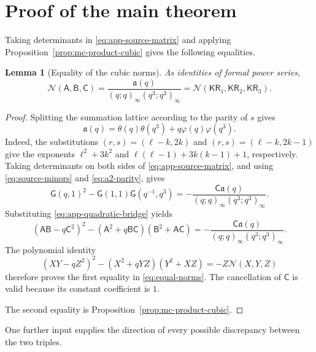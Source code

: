 \documentclass[11pt]{article}
\numberwithin{equation}{section}
\newtheorem{lemma}[theorem]{Lemma}
\theoremstyle{remark}
\newcommand{\KR}{\mathsf{KR}}
\begin{document}
\section{Proof of the main theorem}
\label{sec:positive-completion}

Taking determinants in \eqref{eq:app-source-matrix} and applying
Proposition~\ref{prop:mc-product-cubic} gives the following equalities.

\begin{lemma}[Equality of the cubic norms]\label{lem:equal-norms}
As identities of formal power series,
\begin{equation}\label{eq:equal-norms}
 \mathcal N(\mathsf A,\mathsf B,\mathsf C)
 =\frac{\mathfrak a(q)}{(q;q)_\infty(q^3;q^3)_\infty}
 =\mathcal N(\KR_1,\KR_2,\KR_3).
\end{equation}
\end{lemma}

\begin{proof}
Splitting the summation lattice according to the parity of \(s\)
gives
\begin{equation}\label{eq:a2-parity}
 \mathfrak a(q)=\theta(q)\theta(q^3)
                   +q\varphi(q)\varphi(q^3).
\end{equation}
Indeed, the substitutions \((r,s)=(\ell-k,2k)\) and
\((r,s)=(\ell-k,2k-1)\) give the exponents
\(\ell^2+3k^2\) and
\(\ell(\ell-1)+3k(k-1)+1\), respectively. Taking determinants on both sides of
\eqref{eq:app-source-matrix}, and using \eqref{eq:source-minors}
and \eqref{eq:a2-parity}, gives
\[
 \mathsf G(q,1)^2-\mathsf G(1,1)\mathsf G(q^{-1},q^3)
 =-\frac{\mathsf C\mathfrak a(q)}{(q;q)_\infty(q^3;q^3)_\infty}.
\]
Substituting \eqref{eq:app-quadratic-bridge} yields
\[
 (\mathsf A\mathsf B-q\mathsf C^2)^2
 -(\mathsf A^2+q\mathsf B\mathsf C)(\mathsf B^2+\mathsf A\mathsf C)
 =-\frac{\mathsf C\mathfrak a(q)}{(q;q)_\infty(q^3;q^3)_\infty}.
\]
The polynomial identity
\begin{equation}\label{eq:norm-determinant-factorization}
 (XY-qZ^2)^2-(X^2+qYZ)(Y^2+XZ)
       =-Z\mathcal N(X,Y,Z)
\end{equation}
therefore proves the first equality in \eqref{eq:equal-norms}.
The cancellation of \(\mathsf C\) is valid because its constant coefficient is \(1\).

The second equality is Proposition~\ref{prop:mc-product-cubic}.
\end{proof}

One further input supplies the direction of every possible
discrepancy between the two triples.
\end{document}
